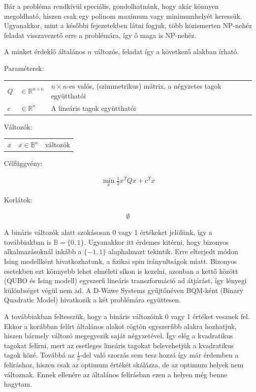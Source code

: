 Bár a probléma rendkívül speciális, gondolhatnánk, hogy akár könnyen megoldható, hiszen csak egy polinom maximum vagy minimumhelyét keressük. Ugyanakkor, mint a későbbi fejezetekben látni fogjuk, több közismerten NP-nehéz feladat visszavezető erre a problémára, így ő maga is NP-nehéz. 

A minket érdeklő általános $n$ változós, feladat így a következő alakban írható.


Paraméterek:

\begin{tabular}{lll}
	$Q$ & $\in \mathbb{R}^{n×n}$  & $n × n$-es valós, (szimmetrikus) mátrix, a négyzetes tagok együtthatói \\
	$c$ & $\in \mathbb{R}^n$   & A lineáris tagok együtthatói \\
\end{tabular}

Változók:

\begin{tabular}{lll}
	$x$ & $x \in \mathbb{B}^n$ & változók \\
\end{tabular}

Célfüggvény:

\begin{align}
	\min_{x} \frac{1}{2} x^T Q x + c^T x 
\end{align}

Korlátok:

\begin{align}
	\emptyset
\end{align}

A bináris változók alatt szokásosan 0 vagy 1 értékeket jelölünk, így a továbbiakban is $\mathbb{B}=\{0,1\}$. Ugyanakkor itt érdemes kitérni, hogy bizonyos alkalmazásoknál inkább a $\{-1,1\}$ alaphalmazt tekintik. Erre elterjedt módon Ising modellként hivatkozhatunk, a fizikai spin irányultságok miatt. Bizonyos esetekben ezt könnyebb lehet elméleti síkon is kezelni, azonban a kettő között (QUBO és Ising modell) egyszerű lineáris transzformáció ad átjárást, így lényegi különbséget végül nem ad. A D-Wawe Systems gyűjtőnéven BQM-ként (Binary Quadratic Model) hivatkozik a két problémára együttesen\cite{DWaveOceanBQM}.

A továbbiakban feltesszük, hogy a bináris változóink 0 vagy 1 értéket vesznek fel. Ekkor a korábban felírt általános alakot rögtön egyszerűbb alakra hozhatjuk, hiszen bármely változó megegyezik saját négyzetével. Így elég a kvadratikus tagokat felírni, mert az esetleges lineáris tagokat belevehetjük a kvadratikus tagok közé. Továbbá az $\frac{1}{2}$-del való szorzás sem tesz hozzá így már érdemben a felíráshoz, hiszen csak az optimum értékét skálázza, de az optimum helyek nem változnak. Ennek ellenére az általános felírásban ezen a helyen még benne hagytam.

